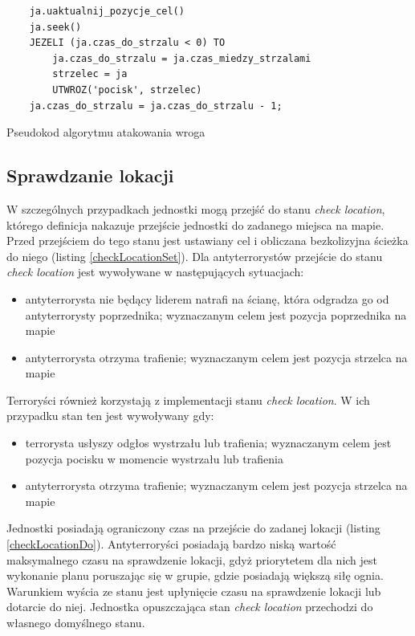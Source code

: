 \begin{table}
\begin{center}
\begin{lstlisting}
	ja.uaktualnij_pozycje_cel()
	ja.seek()				
	JEZELI (ja.czas_do_strzalu < 0) TO
		ja.czas_do_strzalu = ja.czas_miedzy_strzalami
		strzelec = ja
		UTWROZ('pocisk', strzelec)
	ja.czas_do_strzalu = ja.czas_do_strzalu - 1;
\end{lstlisting}
\caption {Pseudokod algorytmu atakowania wroga}
\label{attackCode}
\end{center}
\end{table}

\subsection{Sprawdzanie lokacji}

W szczególnych przypadkach jednostki mogą przejść do stanu \emph{check location}, którego definicja nakazuje przejście jednostki do zadanego miejsca na mapie. Przed przejściem do tego stanu jest ustawiany cel i obliczana bezkolizyjna ścieżka do niego (listing \ref{checkLocationSet}). Dla antyterrorystów przejście do stanu \emph{check location} jest wywoływane w następujących sytuacjach:
\begin{itemize}
	\item antyterrorysta nie będący liderem natrafi na ścianę, która odgradza go od antyterrorysty poprzednika; wyznaczanym celem jest pozycja poprzednika na mapie
	\item antyterrorysta otrzyma trafienie; wyznaczanym celem jest pozycja strzelca na mapie
\end{itemize}

Terroryści również korzystają z implementacji stanu \emph{check location}. W ich przypadku stan ten jest wywoływany gdy:
\begin{itemize}
	\item terrorysta usłyszy odgłos wystrzału lub trafienia; wyznaczanym celem jest pozycja pocisku w momencie wystrzału lub trafienia
	\item antyterrorysta otrzyma trafienie; wyznaczanym celem jest pozycja strzelca na mapie
\end{itemize}

Jednostki posiadają ograniczony czas na przejście do zadanej lokacji (listing \ref{checkLocationDo}). Antyterroryści posiadają bardzo niską wartość maksymalnego czasu na sprawdzenie lokacji, gdyż priorytetem dla nich jest wykonanie planu poruszając się w grupie, gdzie posiadają większą siłę ognia. Warunkiem wyścia ze stanu jest upłynięcie czasu na sprawdzenie lokacji lub dotarcie do niej. Jednostka opuszczająca stan \emph{check location} przechodzi do własnego domyślnego stanu.


